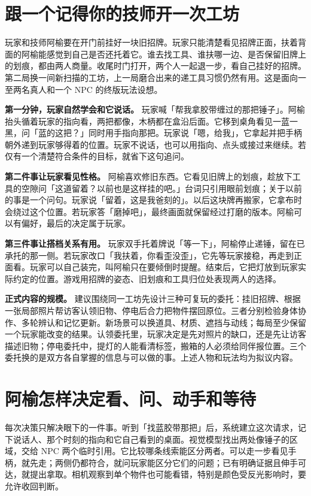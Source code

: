 \documentclass[UTF8,11pt,fontset=fandol,a4paper]{ctexart}
\newcommand{\page}[1]{\clearpage\section{#1}}
\begin{document}
\section{跟一个记得你的技师开一次工坊}
玩家和技师阿榆要在开门前挂好一块旧招牌。玩家只能清楚看见招牌正面，扶着背面的阿榆能感觉到自己是否还托着它。谁去找工具、谁扶哪一边、是否保留旧牌上的划痕，都由两人商量。收尾时门打开，两个人一起退一步，看自己挂好的招牌。第二局换一间新扫描的工坊，上一局磨合出来的递工具习惯仍然有用。这是面向一至两名真人和一个 NPC 的终版玩法设想。

\textbf{第一分钟，玩家自然学会和它说话。} 玩家喊「帮我拿胶带缠过的那把锤子」。阿榆抬头循着玩家的指向看，两把都像，木柄都在盒沿后面。它移到桌角看见一蓝一黑，问「蓝的这把？」同时用手指向那把。玩家说「嗯，给我」，它拿起并把手柄朝外递到玩家够得着的位置。玩家不说话，也可以用指向、点头或接过来继续。若仅有一个清楚符合条件的目标，就省下这句追问。

\textbf{第二件事让玩家看见性格。} 阿榆喜欢修旧东西。它看见旧牌上的划痕，趁放下工具的空隙问「这道留着？以前也是这样挂的吧。」台词只引用眼前划痕；关于以前的事是一个问句。玩家说「留着，这是我爸刻的」。以后这块牌再搬家，它拿布时会绕过这个位置。若玩家答「磨掉吧」，最终画面就保留经过打磨的版本。阿榆可以有偏好，最后的决定属于玩家。

\textbf{第三件事让搭档关系有用。} 玩家双手托着牌说「等一下」，阿榆停止递锤，留在已承托的那一侧。若玩家改口「我扶着，你看歪没歪」，它先等玩家接稳，再走到正面看。玩家可以自己装完，叫阿榆只在要倾倒时提醒。结束后，它把灯放到玩家实际约定的位置。游戏用招牌的姿态、旧划痕和工具归位处表现两人的选择。

\textbf{正式内容的规模。} 建议围绕同一工坊先设计三种可复玩的委托：挂旧招牌、根据一张局部照片帮访客认领旧物、停电后合力把物件摆回原位。三者分别检验身体协作、多轮辨认和记忆更新。新场景可以换道具、材质、遮挡与动线；每局至少保留一个玩家能改变的结果。认领委托里，玩家决定是先对照片的缺口，还是先让访客描述旧物；停电委托中，提灯的人能看清标签，搬箱的人必须给同伴报位置。三个委托换的是双方各自掌握的信息与可以做的事。上述人物和玩法均为拟议内容。

\page{阿榆怎样决定看、问、动手和等待}
每次决策只解决眼下的一件事。听到「找蓝胶带那把」后，系统建立这次请求，记下说话人、那个时刻的指向和它自己看到的桌面。视觉模型找出两处像锤子的区域，交给 NPC 两个临时引用。它比较哪条线索能区分两者。可以走一步看见手柄，就先走；两侧仍都符合，就问玩家能区分它们的问题；已有明确证据且伸手可达，就提出拿取。相机观察到单个物件也可能看错，特别是颜色受反光影响时，要允许收回判断。
\end{document}
